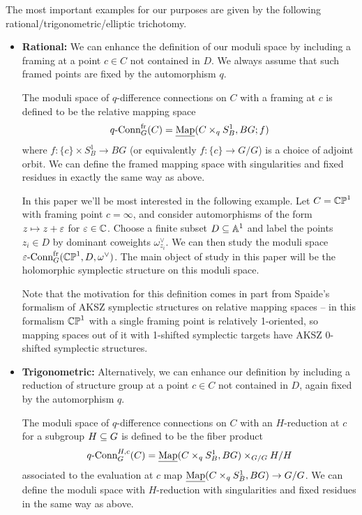 \documentclass[10pt, oneside]{article}
\newcommand{\map}{\ul{\mr{Map}}}
\newcommand{\qconn}{q\text{-Conn}}
\newcommand{\epsconn}{\varepsilon\text{-Conn}}
\newcommand{\fr}{\mathrm{fr}}
\begin{document}
\begin{examples}
The most important examples for our purposes are given by the following rational/trigonometric/elliptic trichotomy.
 \begin{itemize}
  \item \textbf{Rational:} We can enhance the definition of our moduli space by including a framing at a point $c \in C$ not contained in $D$.  We always assume that such framed points are fixed by the automorphism $q$.
    \begin{definition}
      \label{def:framing}
    The moduli space of $q$-difference connections on $C$ with a framing at $c$ is defined to be the relative mapping space 
    \[\qconn_G^\fr(C) = \map(C \times_q S^1_B, BG; f)\]
    where $f \colon \{c\} \times S^1_B \to BG$ (or equivalently $f \colon \{c\} \to G/G$) is a choice of adjoint orbit.  We can define the framed mapping space with singularities and fixed residues in exactly the same way as above.  
  \end{definition}
    
    In this paper we'll be most interested in the following example.  Let $C = \mathbb{CP}^1$ with framing point $c = \infty$, and consider automorphisms of the form $z \mapsto z + \varepsilon$ for $\varepsilon \in \mathbb{C}$.  Choose a finite subset $D \subseteq \mathbb{A}^1$ and label the points $z_i \in D$ by dominant coweights $\omega^\vee_{z_i}$.  We can then study the moduli space $\epsconn^\fr_G(\bb{CP}^1,D, \omega^\vee)$.  The main object of study in this paper will be the holomorphic symplectic structure on this moduli space.  
    
    Note that the motivation for this definition comes in part from Spaide's formalism \cite{Spaide} of AKSZ symplectic structures on relative mapping spaces -- in this formalism $\mathbb{CP}^1$ with a single framing point is relatively 1-oriented, so mapping spaces out of it with 1-shifted symplectic targets have AKSZ 0-shifted symplectic structures.
  
  \item \textbf{Trigonometric:} Alternatively, we can enhance our definition by including a reduction of structure group at a point $c \in C$ not contained in $D$, again fixed by the automorphism $q$.
  \begin{definition}
   The moduli space of $q$-difference connections on $C$ with an $H$-reduction at $c$ for a subgroup $H \subseteq G$ is defined to be the fiber product
   \[\qconn_G^{H,c}(C) = \map(C \times_q S^1_B,BG) \times_{G/G} H/H\]
   associated to the evaluation at $c$ map $\map(C \times_q S^1_B,BG) \to G/G$.  We can define the moduli space with $H$-reduction with singularities and fixed residues in the same way as above.
  \end{definition}
  

\end{itemize}
\end{examples}
\end{document}
